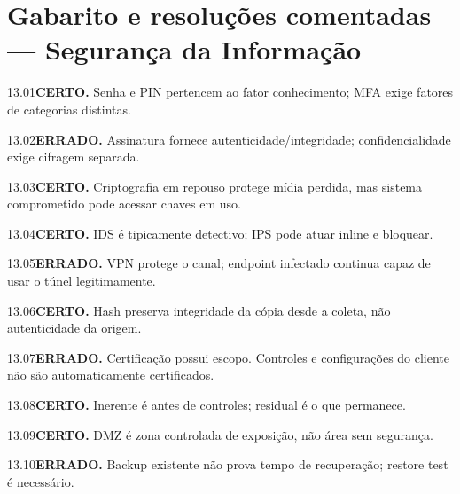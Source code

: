 \section{Gabarito e resoluções comentadas — Segurança da Informação}

\begin{solucao}{13.01}\textbf{CERTO.} Senha e PIN pertencem ao fator conhecimento; MFA exige fatores de categorias distintas.\end{solucao}
\begin{solucao}{13.02}\textbf{ERRADO.} Assinatura fornece autenticidade/integridade; confidencialidade exige cifragem separada.\end{solucao}
\begin{solucao}{13.03}\textbf{CERTO.} Criptografia em repouso protege mídia perdida, mas sistema comprometido pode acessar chaves em uso.\end{solucao}
\begin{solucao}{13.04}\textbf{CERTO.} IDS é tipicamente detectivo; IPS pode atuar inline e bloquear.\end{solucao}
\begin{solucao}{13.05}\textbf{ERRADO.} VPN protege o canal; endpoint infectado continua capaz de usar o túnel legitimamente.\end{solucao}
\begin{solucao}{13.06}\textbf{CERTO.} Hash preserva integridade da cópia desde a coleta, não autenticidade da origem.\end{solucao}
\begin{solucao}{13.07}\textbf{ERRADO.} Certificação possui escopo. Controles e configurações do cliente não são automaticamente certificados.\end{solucao}
\begin{solucao}{13.08}\textbf{CERTO.} Inerente é antes de controles; residual é o que permanece.\end{solucao}
\begin{solucao}{13.09}\textbf{CERTO.} DMZ é zona controlada de exposição, não área sem segurança.\end{solucao}
\begin{solucao}{13.10}\textbf{ERRADO.} Backup existente não prova tempo de recuperação; restore test é necessário.\end{solucao}

